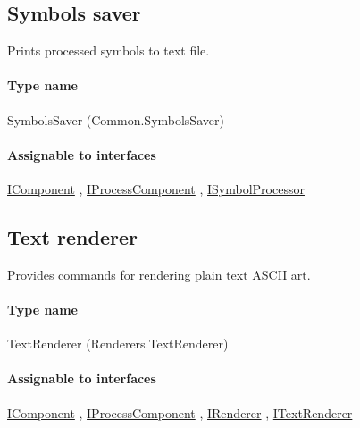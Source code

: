 
\subsection{Symbols saver}
\label{Malsys.Processing.Components.Common.SymbolsSaver}
Prints processed symbols to text file.\paragraph{Type name}
SymbolsSaver (Common.SymbolsSaver) 	\paragraph{Assignable to interfaces}
		\hyperref[Malsys.Processing.Components.IComponent]{IComponent}%
, 		\hyperref[Malsys.Processing.Components.IProcessComponent]{IProcessComponent}%
, 		\hyperref[Malsys.Processing.Components.ISymbolProcessor]{ISymbolProcessor}%
	

\subsection{Text renderer}
\label{Malsys.Processing.Components.Renderers.TextRenderer}
Provides commands for rendering plain text ASCII art.\paragraph{Type name}
TextRenderer (Renderers.TextRenderer) 	\paragraph{Assignable to interfaces}
		\hyperref[Malsys.Processing.Components.IComponent]{IComponent}%
, 		\hyperref[Malsys.Processing.Components.IProcessComponent]{IProcessComponent}%
, 		\hyperref[Malsys.Processing.Components.IRenderer]{IRenderer}%
, 		\hyperref[Malsys.Processing.Components.Renderers.ITextRenderer]{ITextRenderer}%
	

